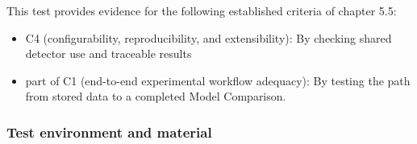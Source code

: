 This test provides evidence for the following established criteria of chapter 5.5:
\begin{itemize}
    \item C4 (configurability, reproducibility, and extensibility): By checking shared detector use and traceable results
    \item part of C1 (end-to-end experimental workflow adequacy): By testing the path from stored data to a completed Model Comparison.
\end{itemize}


\subsubsection{Test environment and material}





